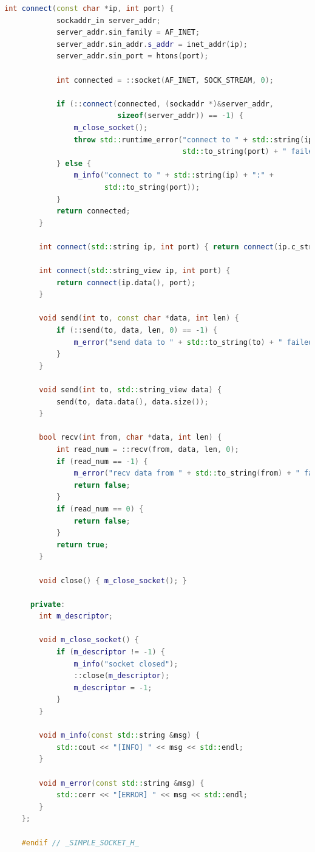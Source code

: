 \documentclass{article}
\begin{document}
\begin{lstlisting}[language=C++]
        int connect(const char *ip, int port) {
            sockaddr_in server_addr;
            server_addr.sin_family = AF_INET;
            server_addr.sin_addr.s_addr = inet_addr(ip);
            server_addr.sin_port = htons(port);
    
            int connected = ::socket(AF_INET, SOCK_STREAM, 0);
    
            if (::connect(connected, (sockaddr *)&server_addr,
                          sizeof(server_addr)) == -1) {
                m_close_socket();
                throw std::runtime_error("connect to " + std::string(ip) + ":" +
                                         std::to_string(port) + " failed");
            } else {
                m_info("connect to " + std::string(ip) + ":" +
                       std::to_string(port));
            }
            return connected;
        }
    
        int connect(std::string ip, int port) { return connect(ip.c_str(), port); }
    
        int connect(std::string_view ip, int port) {
            return connect(ip.data(), port);
        }
    
        void send(int to, const char *data, int len) {
            if (::send(to, data, len, 0) == -1) {
                m_error("send data to " + std::to_string(to) + " failed");
            }
        }
    
        void send(int to, std::string_view data) {
            send(to, data.data(), data.size());
        }
    
        bool recv(int from, char *data, int len) {
            int read_num = ::recv(from, data, len, 0);
            if (read_num == -1) {
                m_error("recv data from " + std::to_string(from) + " failed");
                return false;
            }
            if (read_num == 0) {
                return false;
            }
            return true;
        }
    
        void close() { m_close_socket(); }
    
      private:
        int m_descriptor;
    
        void m_close_socket() {
            if (m_descriptor != -1) {
                m_info("socket closed");
                ::close(m_descriptor);
                m_descriptor = -1;
            }
        }
    
        void m_info(const std::string &msg) {
            std::cout << "[INFO] " << msg << std::endl;
        }
    
        void m_error(const std::string &msg) {
            std::cerr << "[ERROR] " << msg << std::endl;
        }
    };
    
    #endif // _SIMPLE_SOCKET_H_    
\end{lstlisting}
\end{document}
